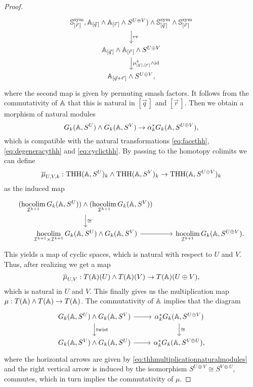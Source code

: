 \begin{proof}
\begin{equation}
\begin{tikzcd}
\spherespectrum^{\mathrm{sym}}_{[\vec{r}\,]} , 
\A_{[\vec{q}\,]}\wedge \A_{[\vec{r}\,]}\wedge S^{U\oplus V}) 
\wedge \spherespectrum^{\mathrm{sym}}_{[\vec{q}\,]} \wedge 
\spherespectrum^{\mathrm{sym}}_{[\vec{r}\,]}
\arrow{d}{\mathrm{ev}}\\
\A_{[\vec{q}\,]}\wedge \A_{[\vec{r}\,]}\wedge S^{U\oplus V}
\arrow{d}{\mu^\A_{[\vec{q}\,], [\vec{r}\,]}\wedge \mathrm{id}}\\
\A_{[\vec{q}+\vec{r}\,]}\wedge S^{U\oplus V},
\end{tikzcd}
\end{equation}
where the second map is given by permuting smash factors.
It follows from the commutativity of $\mathbb{A}$ that this is natural in $[\vec{q}\,]$
and $[\vec{r}\,]$. 
Then we obtain a morphism of natural modules
\begin{equation}\label{eq:thhmultiplicationnaturalmodules}
G_k(\mathbb{A}, S^U)\wedge G_k(\mathbb{A}, S^V)\to \alpha_k^\ast G_k(\mathbb{A},S^{U\oplus V} ),
\end{equation}
which is compatible with the natural transformations \eqref{eq:facethh}, 
\eqref{eq:degeneracythh} and \eqref{eq:cyclicthh}. By passing
to the homotopy colimits we can define 
\begin{equation}\label{eq:thhlevelmultiplication}
\overline{\mu}_{U,V,k}:\mathrm{THH}(\mathbb{A}, S^U)_k\wedge
\mathrm{THH}(\mathbb{A}, S^V)_k\to \mathrm{THH}(\mathbb{A}, S^{U\oplus V})_k
\end{equation}
as the induced map
\[
\begin{tikzcd}
(\underset{\mathcal{I}^{k+1}}{\hocolim}\, G_k(\A, S^U))\wedge
(\underset{\mathcal{I}^{k+1}}{\hocolim}\, G_k(\A, S^V))
\arrow{d}{\cong}\\
\underset{\mathcal{I}^{k+1}\times \mathcal{I}^{k+1}}{\hocolim}\, G_k(\A, S^U)\wedge G_k(\A, S^V)
\arrow{r} 
&\underset{\mathcal{I}^{k+1}}{\hocolim}\, G_k(\A, S^{U\oplus V}).
\end{tikzcd}
\]
This yields a map of cyclic spaces, which is natural with respect to $U$ and $V$.
Thus, after realizing we get a map 
\begin{equation}\label{eq:thhmultiplicationspacelevel}
\overline{\mu}_{U,V}: T(\mathbb{A})(U)\wedge T(\mathbb{A})(V)\to T(\mathbb{A})(U\oplus V),
\end{equation}
which is natural in $U$ and $V$. This finally gives us the multiplication
map $\mu: T(\mathbb{A})\wedge T(\mathbb{A})\to T(\mathbb{A})$. The commutativity of $\mathbb{A}$
implies that the diagram
\[
\begin{tikzcd}
G_k(\A,S^U)\wedge G_k(\A, S^V)
\arrow{d}{\mathrm{twist}}\arrow{r}
&\alpha_k^\ast G_k(\A,S^{U\oplus V})\arrow{d}{\cong}\\
G_k(\A, S^V)\wedge G_k(\A, S^U)
\arrow{r}
&\alpha_k^\ast G_k(\A, S^{V\oplus U}),
\end{tikzcd}
\]
where the horizontal arrows are given by \eqref{eq:thhmultiplicationnaturalmodules}
and the right vertical arrow is induced by the isomorphism $S^{U\oplus V}\cong S^{V\oplus U}$,
commutes, which in turn implies the commutativity of $\mu$.


\end{proof}

